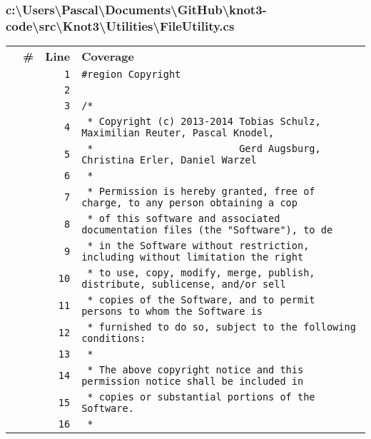 \documentclass[a4paper,10pt]{article}
\begin{document}
\subsubsection{c:\textbackslash Users\textbackslash Pascal\textbackslash Documents\textbackslash GitHub\textbackslash knot3-code\textbackslash src\textbackslash Knot3\textbackslash Utilities\textbackslash FileUtility.cs}
\begin{longtable}[l]{lrrl}
\textbf{} & \textbf{\#} & \textbf{Line} & \textbf{Coverage}\\
\cellcolor{gray} &  & \verb~1~ & \verb~#region Copyright~\\
\cellcolor{gray} &  & \verb~2~ & \verb~~\\
\cellcolor{gray} &  & \verb~3~ & \verb~/*~\\
\cellcolor{gray} &  & \verb~4~ & \verb~ * Copyright (c) 2013-2014 Tobias Schulz, Maximilian Reuter, Pascal Knodel,~\\
\cellcolor{gray} &  & \verb~5~ & \verb~ *                         Gerd Augsburg, Christina Erler, Daniel Warzel~\\
\cellcolor{gray} &  & \verb~6~ & \verb~ *~\\
\cellcolor{gray} &  & \verb~7~ & \verb~ * Permission is hereby granted, free of charge, to any person obtaining a cop~\\
\cellcolor{gray} &  & \verb~8~ & \verb~ * of this software and associated documentation files (the "Software"), to de~\\
\cellcolor{gray} &  & \verb~9~ & \verb~ * in the Software without restriction, including without limitation the right~\\
\cellcolor{gray} &  & \verb~10~ & \verb~ * to use, copy, modify, merge, publish, distribute, sublicense, and/or sell~\\
\cellcolor{gray} &  & \verb~11~ & \verb~ * copies of the Software, and to permit persons to whom the Software is~\\
\cellcolor{gray} &  & \verb~12~ & \verb~ * furnished to do so, subject to the following conditions:~\\
\cellcolor{gray} &  & \verb~13~ & \verb~ *~\\
\cellcolor{gray} &  & \verb~14~ & \verb~ * The above copyright notice and this permission notice shall be included in ~\\
\cellcolor{gray} &  & \verb~15~ & \verb~ * copies or substantial portions of the Software.~\\
\cellcolor{gray} &  & \verb~16~ & \verb~ *~\\

\end{longtable}
\end{document}
